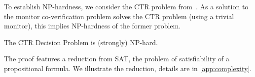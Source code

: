 \documentclass[runningheads]{llncs}
\begin{document}
To establish NP-hardness, we consider the CTR problem from~. As a solution to the monitor co-verification problem solves the CTR problem (using a trivial monitor), this implies NP-hardness of the former problem.
\begin{lemma}
    \label{lem:ctpdecnphard}
    The CTR Decision Problem is (strongly) NP-hard.
\end{lemma}
The proof features a reduction from SAT, the problem of satisfiability of a propositional formula. We illustrate the reduction, details are in \cref{app:complexity}.

\end{document}
